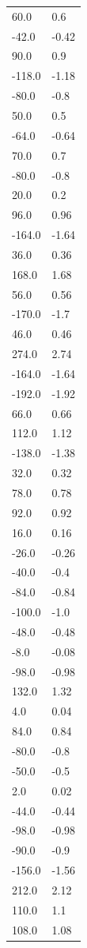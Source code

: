 \begin{longtable}{ll}
60.0 & 0.6 \\
-42.0 & -0.42 \\
90.0 & 0.9 \\
-118.0 & -1.18 \\
-80.0 & -0.8 \\
50.0 & 0.5 \\
-64.0 & -0.64 \\
70.0 & 0.7 \\
-80.0 & -0.8 \\
20.0 & 0.2 \\
96.0 & 0.96 \\
-164.0 & -1.64 \\
36.0 & 0.36 \\
168.0 & 1.68 \\
56.0 & 0.56 \\
-170.0 & -1.7 \\
46.0 & 0.46 \\
274.0 & 2.74 \\
-164.0 & -1.64 \\
-192.0 & -1.92 \\
66.0 & 0.66 \\
112.0 & 1.12 \\
-138.0 & -1.38 \\
32.0 & 0.32 \\
78.0 & 0.78 \\
92.0 & 0.92 \\
16.0 & 0.16 \\
-26.0 & -0.26 \\
-40.0 & -0.4 \\
-84.0 & -0.84 \\
-100.0 & -1.0 \\
-48.0 & -0.48 \\
-8.0 & -0.08 \\
-98.0 & -0.98 \\
132.0 & 1.32 \\
4.0 & 0.04 \\
84.0 & 0.84 \\
-80.0 & -0.8 \\
-50.0 & -0.5 \\
2.0 & 0.02 \\
-44.0 & -0.44 \\
-98.0 & -0.98 \\
-90.0 & -0.9 \\
-156.0 & -1.56 \\
212.0 & 2.12 \\
110.0 & 1.1 \\
108.0 & 1.08 \\

\end{longtable}
